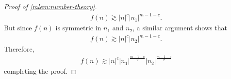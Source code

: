\begin{proof}[Proof of \cref{mlem:number-theory}]
\begin{equation*}
	\begin{split}
		f(n) \gtrsim |n|^{c} | n_1 |^{m-1-c}. 
	\end{split}
\end{equation*}
%
%
But since $f(n)$ is symmetric in $n_1$ and $n_2$, a similar argument shows that
%
%
\begin{equation*}
	\begin{split}
		f(n) \gtrsim |n|^{c} | n_2 |^{m-1-c}. 
	\end{split}
\end{equation*}
%
%
Therefore,
%
%
\begin{equation*}
	\begin{split}
		f(n) \gtrsim | n |^{c}| n_1 |^{\frac{m-1-c}{2}} | n_2 |^{\frac{m-1-c}{2}}
	\end{split}
\end{equation*}
%
%
completing the proof. 
%
\end{proof}
%
%

